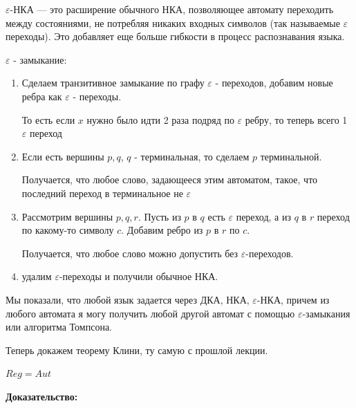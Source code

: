 $\varepsilon$-НКА  --- это расширение обычного НКА, позволяющее автомату переходить между состояниями, не потребляя никаких входных символов (так называемые $\varepsilon$ переходы). Это добавляет еще больше гибкости в процесс распознавания языка.

$\varepsilon$ - замыкание:

\begin{enumerate}
    \item  Сделаем транзитивное замыкание по графу $\varepsilon$ - переходов, добавим новые ребра как $\varepsilon$ - переходы.
    
     То есть если $x$ нужно было идти 2 раза подряд по $\varepsilon$ ребру, то теперь всего 1 $\varepsilon$ переход
     \item  Если есть вершины $p,q$, $q$ - терминальная, то сделаем $p$ терминальной. 
     
     Получается, что любое слово, задающееся этим автоматом, такое, что последний переход в терминальное не $\varepsilon$
     \item Рассмотрим вершины $p,q,r$. Пусть из $p$ в $q$ есть $\varepsilon$ переход, а из $q$ в $r$ переход по какому-то символу $c$. Добавим ребро из $p$ в $r$ по $c$. 

     Получается, что любое слово можно допустить без $\varepsilon$-переходов.
     \item удалим $\varepsilon$-переходы и получили обычное НКА.
\end{enumerate}

Мы показали, что любой язык задается через ДКА, НКА, $\varepsilon$-НКА, причем из любого автомата я могу получить любой другой автомат с помощью $\varepsilon$-замыкания или алгоритма Томпсона.


Теперь докажем теорему Клини, ту самую с прошлой лекции. 


$Reg = Aut$

\textbf{Доказательство:}

